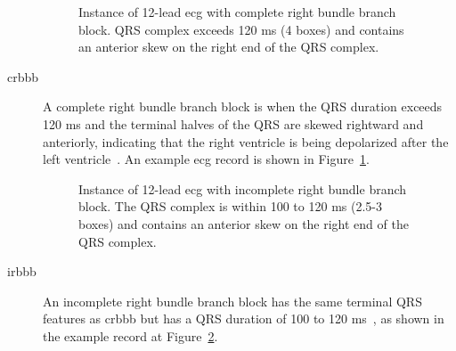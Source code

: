 \documentclass[\main/thesis.tex]{subfiles}
\begin{document}
\begin{description}
    \begin{figure}[ht]
        \centering
        \caption{Instance of 12-lead \gls{ecg} with complete right bundle branch block. QRS complex exceeds 120 ms (4 boxes) and contains an anterior skew on the right end of the QRS complex.}
        \label{fig:full_CRBBB}
    \end{figure} 
    \item[\gls{crbbb}] A complete right bundle branch block is when the QRS duration exceeds 120 ms and the terminal halves of the QRS are skewed rightward and anteriorly, indicating that the right ventricle is being depolarized after the left ventricle~\cite{ecg-utah-lesson}. An example \gls{ecg} record is shown in Figure~\ref{fig:full_CRBBB}.

    \begin{figure}[ht]
        \centering
        \caption{Instance of 12-lead \gls{ecg} with incomplete right bundle branch block. The QRS complex is within 100 to 120 ms (2.5-3 boxes) and contains an anterior skew on the right end of the QRS complex.}
        \label{fig:full_IRBBB}
    \end{figure} 
    \item[\gls{irbbb}] An incomplete right bundle branch block has the same terminal QRS features as \gls{crbbb} but has a QRS duration of 100 to 120 ms~\cite{ecg-utah-lesson}, as shown in the example record at Figure~\ref{fig:full_IRBBB}.


\end{description}
\end{document}
